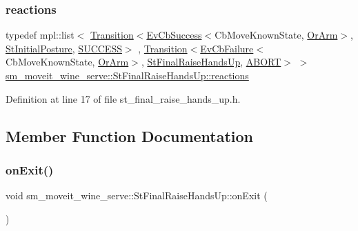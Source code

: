 \subsubsection{\texorpdfstring{reactions}{reactions}}
{\footnotesize\ttfamily typedef mpl\+::list$<$ \hyperlink{classsmacc_1_1Transition}{Transition}$<$\hyperlink{structsmacc_1_1EvCbSuccess}{Ev\+Cb\+Success}$<$Cb\+Move\+Known\+State, \hyperlink{classsm__moveit__wine__serve_1_1OrArm}{Or\+Arm}$>$, \hyperlink{structsm__moveit__wine__serve_1_1StInitialPosture}{St\+Initial\+Posture}, \hyperlink{structsmacc_1_1default__transition__tags_1_1SUCCESS}{S\+U\+C\+C\+E\+SS}$>$ , \hyperlink{classsmacc_1_1Transition}{Transition}$<$\hyperlink{structsmacc_1_1EvCbFailure}{Ev\+Cb\+Failure}$<$Cb\+Move\+Known\+State, \hyperlink{classsm__moveit__wine__serve_1_1OrArm}{Or\+Arm}$>$, \hyperlink{structsm__moveit__wine__serve_1_1StFinalRaiseHandsUp}{St\+Final\+Raise\+Hands\+Up}, \hyperlink{structsmacc_1_1default__transition__tags_1_1ABORT}{A\+B\+O\+RT}$>$ $>$ \hyperlink{structsm__moveit__wine__serve_1_1StFinalRaiseHandsUp_a03e82b7bd0267c500b96766319ed6e63}{sm\+\_\+moveit\+\_\+wine\+\_\+serve\+::\+St\+Final\+Raise\+Hands\+Up\+::reactions}}



Definition at line 17 of file st\+\_\+final\+\_\+raise\+\_\+hands\+\_\+up.\+h.



\subsection{Member Function Documentation}
\mbox{\label{structsm__moveit__wine__serve_1_1StFinalRaiseHandsUp_aba8a13d303ad80be893ee8a7d74ff70c}} 
\subsubsection{\texorpdfstring{on\+Exit()}{onExit()}}
{\footnotesize\ttfamily void sm\+\_\+moveit\+\_\+wine\+\_\+serve\+::\+St\+Final\+Raise\+Hands\+Up\+::on\+Exit (\begin{DoxyParamCaption}\item[{\hyperlink{structsmacc_1_1default__transition__tags_1_1ABORT}{A\+B\+O\+RT}}]{ }\end{DoxyParamCaption})\hspace{0.3cm}{\ttfamily [inline]}}



